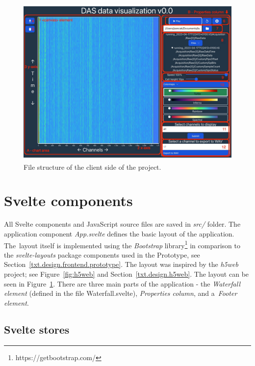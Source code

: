 \begin{figure}
    \centering
    \includegraphics[angle=90,width=\linewidth]{pdf/screenshot_red_pdf.pdf}
    \caption{File structure of the client side of the project.}
    \label{fig:app_layout}
\end{figure}

\section{Svelte components}\label{txt.implementation.components}

All Svelte components and JavaScript source files are saved in \textit{src/} folder. The application component \textit{App.svelte} defines the basic layout of the application. The~layout itself is implemented using the \textit{Bootstrap} library\footnote{https://getbootstrap.com/} in comparison to the \textit{svelte-layouts} package components used in the Prototype, see Section~\ref{txt.design.frontend.prototype}. The layout was inspired by the \textit{h5web} project; see Figure~\ref{fig:h5web} and Section~\ref{txt.design.h5web}. The layout can be seen in Figure~\ref{fig:app_layout}. There are three main parts of the application - the \textit{Waterfall element} (defined in the file Waterfall.svelte), \textit{Properties column}, and a~\textit{Footer element}.


\subsection{Svelte stores}\label{txt.implementation.stores}

